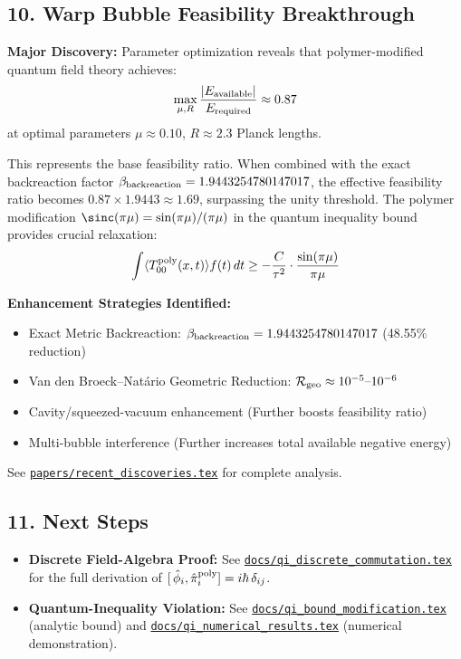 \documentclass[12pt]{article}
\begin{document}
\subsection*{10. Warp Bubble Feasibility Breakthrough}
\textbf{Major Discovery:} Parameter optimization reveals that polymer-modified quantum field theory achieves:
\begin{align*}
  \max_{\mu,R}\frac{|E_{\rm available}|}{E_{\rm required}} \approx 0.87
\end{align*}
at optimal parameters $\mu \approx 0.10$, $R \approx 2.3$ Planck lengths.

This represents the base feasibility ratio. When combined with the exact backreaction factor $\beta_{\rm backreaction} = 1.9443254780147017$, the effective feasibility ratio becomes $0.87 \times 1.9443 \approx 1.69$, surpassing the unity threshold. The polymer modification $\sinc(\pi\mu) = \sin(\pi\mu)/(\pi\mu)$ in the quantum inequality bound provides crucial relaxation:
\begin{align*}
  \int \langle T_{00}^{\rm poly}(x,t) \rangle f(t)\,dt \geq -\frac{C}{\tau^2} \cdot \frac{\sin(\pi\mu)}{\pi\mu}
\end{align*}

\textbf{Enhancement Strategies Identified:}
\begin{itemize}
  \item Exact Metric Backreaction: $\beta_{\rm backreaction} = 1.9443254780147017$ (48.55\% reduction)
  \item Van den Broeck–Natário Geometric Reduction: $\mathcal{R}_{\rm geo}\approx10^{-5}\text{–}10^{-6}$
  \item Cavity/squeezed-vacuum enhancement (Further boosts feasibility ratio)
  \item Multi-bubble interference (Further increases total available negative energy)
\end{itemize}

See \href{https://github.com/arcticoder/warp-bubble-qft/blob/main/papers/recent_discoveries.tex}{\texttt{papers/recent\_discoveries.tex}} for complete analysis.

\subsection*{11. Next Steps}
\begin{itemize}
  \item 
    \textbf{Discrete Field-Algebra Proof:} 
    See \href{https://github.com/arcticoder/warp-bubble-qft/blob/main/docs/qi_discrete_commutation.tex}{\texttt{docs/qi\_discrete\_commutation.tex}} 
    for the full derivation of \([\,\hat\phi_i,\hat\pi_i^{\rm poly}]=i\hbar\,\delta_{ij}\).
  \item 
    \textbf{Quantum-Inequality Violation:} 
    See 
    \href{https://github.com/arcticoder/warp-bubble-qft/blob/main/docs/qi_bound_modification.tex}{\texttt{docs/qi\_bound\_modification.tex}} 
    (analytic bound) and 
    \href{https://github.com/arcticoder/warp-bubble-qft/blob/main/docs/qi_numerical_results.tex}{\texttt{docs/qi\_numerical\_results.tex}} 
    (numerical demonstration). 
\end{itemize}
\end{document}
